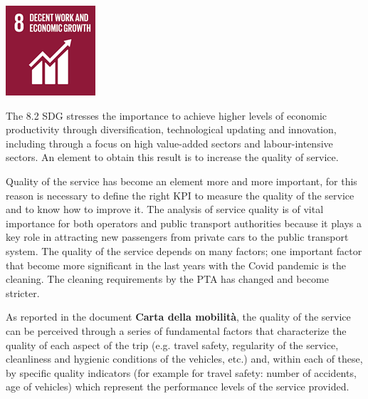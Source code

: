 \begin{minipage}[c]{0.2\textwidth}
    \includegraphics[width=\textwidth]{Images/Social_sustainability/8_work.png}
\end{minipage}
\begin{minipage}[c]{0.8\textwidth}
The 8.2 SDG  stresses the importance to achieve higher levels of economic productivity through diversification, technological updating and innovation, including through a focus on high value-added sectors and labour-intensive sectors. An element to obtain this result is to increase the quality of service.
\end{minipage}
\hfill

Quality of the service has become an element more and more important, for this reason is necessary to define the right KPI to measure the quality of the service and to know how to improve it. The analysis of service quality is of vital importance for both operators and public transport authorities because it plays a key role in attracting new passengers from private cars to the public transport system. The quality of the service depends on many factors; one important factor that become more significant in the last years with the Covid pandemic is the cleaning. The cleaning requirements by the PTA has changed and become stricter.

As reported in the document \textbf{Carta della mobilità},  the quality of the service can be perceived through a series of fundamental factors that characterize the quality of each aspect of the trip (e.g. travel safety, regularity of the service, cleanliness and hygienic conditions of the vehicles, etc.) and, within each of these, by specific quality indicators (for example for travel safety: number of accidents, age of vehicles) which represent the performance levels of the service provided.

